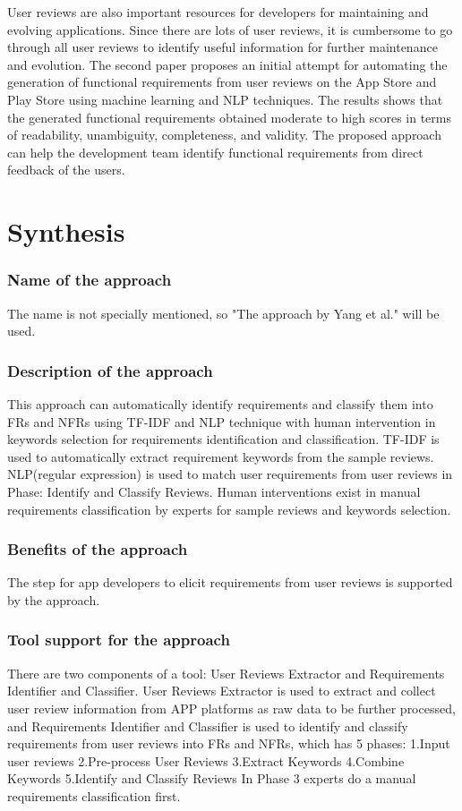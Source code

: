 User reviews are also important resources for developers for maintaining and evolving applications. Since there are lots of user reviews, it is cumbersome to go through all user reviews to identify useful information for further maintenance and evolution. The second paper proposes an initial attempt for automating the generation of
functional requirements from user reviews on the App Store and Play Store using machine learning and NLP techniques. The results shows that the generated functional requirements obtained moderate to high scores in terms of readability, unambiguity, completeness, and validity. The proposed approach can help the development team identify functional requirements from direct feedback of the users.

\section{Synthesis}

\subsubsection{Name of the approach}

The name is not specially mentioned, so "The approach by Yang et al." will be used.

\subsubsection{Description of the approach}

This approach can automatically identify requirements and classify them into FRs and NFRs using TF-IDF and NLP technique with human intervention in keywords selection for requirements identification and classification.
TF-IDF is used to automatically extract requirement keywords from the sample reviews.
NLP(regular expression) is used to match user requirements from user reviews in Phase: Identify and Classify Reviews.
Human interventions exist in manual requirements classification by experts for sample reviews and keywords selection.

\subsubsection{Benefits  of the approach}
The step for app developers to elicit requirements from user reviews is supported by the approach.

\subsubsection{Tool support for the approach}
There are two components of a tool: User Reviews Extractor and Requirements Identifier and Classifier. User Reviews Extractor is used to extract and collect user review information from APP platforms as raw data to be further processed, and Requirements Identifier and Classifier is used to identify and classify requirements from user reviews into FRs and NFRs, which has 5 phases: 1.Input user reviews 2.Pre-process User Reviews 3.Extract Keywords 4.Combine Keywords 5.Identify and Classify Reviews
In Phase 3 experts do a manual requirements classification first.

